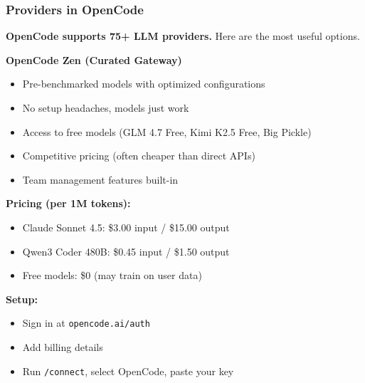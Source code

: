 \begin{frame}[fragile]\frametitle{Providers in OpenCode}

\textbf{OpenCode supports 75+ LLM providers.} Here are the most useful options.

\vspace{0.3cm}
\textbf{OpenCode Zen (Curated Gateway)}

\begin{itemize}
    \item Pre-benchmarked models with optimized configurations
    \item No setup headaches, models just work
    \item Access to free models (GLM 4.7 Free, Kimi K2.5 Free, Big Pickle)
    \item Competitive pricing (often cheaper than direct APIs)
    \item Team management features built-in
\end{itemize}

\vspace{0.3cm}
\textbf{Pricing (per 1M tokens):}
\begin{itemize}
    \item Claude Sonnet 4.5: \$3.00 input / \$15.00 output
    \item Qwen3 Coder 480B: \$0.45 input / \$1.50 output
    \item Free models: \$0 (may train on user data)
\end{itemize}

\vspace{0.3cm}
\textbf{Setup:}
\begin{itemize}
    \item Sign in at \texttt{opencode.ai/auth}
    \item Add billing details
    \item Run \texttt{/connect}, select OpenCode, paste your key
\end{itemize}

\end{frame}

